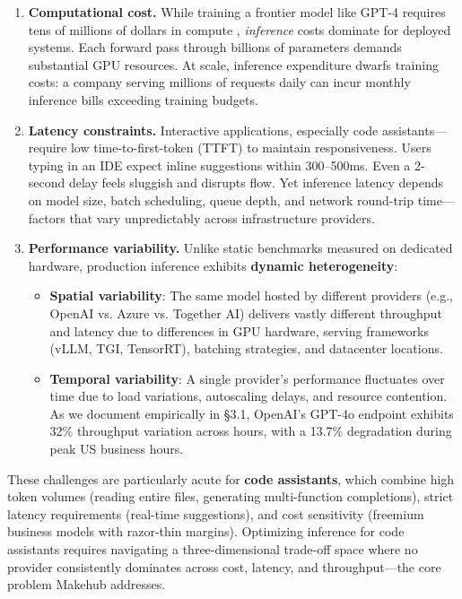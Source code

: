 \documentclass[english]{article}
\begin{document}
\begin{enumerate}
\item \textbf{Computational cost.} While training a frontier model like GPT-4 requires tens of millions of dollars in compute \parencite{hoffmann2022training}, \emph{inference} costs dominate for deployed systems. Each forward pass through billions of parameters demands substantial GPU resources. At scale, inference expenditure dwarfs training costs: a company serving millions of requests daily can incur monthly inference bills exceeding training budgets.

\item \textbf{Latency constraints.} Interactive applications, especially code assistants—require low time-to-first-token (TTFT) to maintain responsiveness. Users typing in an IDE expect inline suggestions within 300--500ms. Even a 2-second delay feels sluggish and disrupts flow. Yet inference latency depends on model size, batch scheduling, queue depth, and network round-trip time—factors that vary unpredictably across infrastructure providers.

\item \textbf{Performance variability.} Unlike static benchmarks measured on dedicated hardware, production inference exhibits \textbf{dynamic heterogeneity}:
\begin{itemize}
    \item \textbf{Spatial variability}: The same model hosted by different providers (e.g., OpenAI vs. Azure vs. Together AI) delivers vastly different throughput and latency due to differences in GPU hardware, serving frameworks (vLLM, TGI, TensorRT), batching strategies, and datacenter locations.
    \item \textbf{Temporal variability}: A single provider's performance fluctuates over time due to load variations, autoscaling delays, and resource contention. As we document empirically in §3.1, OpenAI's GPT-4o endpoint exhibits 32\% throughput variation across hours, with a 13.7\% degradation during peak US business hours.
\end{itemize}
\end{enumerate}

\medskip

\noindent These challenges are particularly acute for \textbf{code assistants}, which combine high token volumes (reading entire files, generating multi-function completions), strict latency requirements (real-time suggestions), and cost sensitivity (freemium business models with razor-thin margins). Optimizing inference for code assistants requires navigating a three-dimensional trade-off space where no provider consistently dominates across cost, latency, and throughput—the core problem Makehub addresses.
\end{document}
